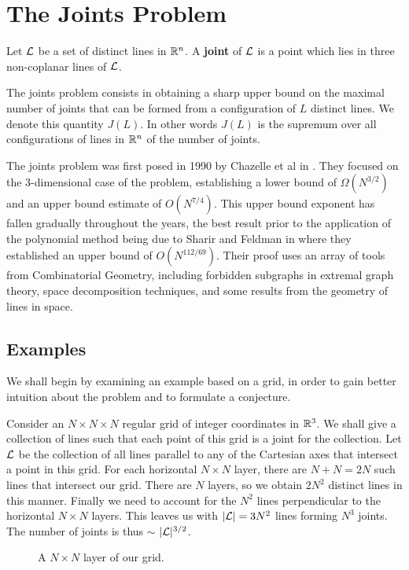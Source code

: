 \chapter{The Joints Problem \label{chap:joints}}
\begin{definition}
    Let $\mathcal L$ be a set of distinct lines in $\mathbb R^n$. A \textbf{joint} of $\mathcal L$ is a point which lies in three non-coplanar lines of $\mathcal L$.
\end{definition}
The joints problem consists in obtaining a sharp upper bound on the maximal number of joints that can be formed from a configuration of $L$ distinct lines.
We denote this quantity $J(L)$. In other words $J(L)$ is the supremum over all configurations of lines in $\mathbb R^n$ of the number of joints.

The joints problem was first posed in 1990 by Chazelle et al in \cite{chazelle1990counting}. They focused on the 3-dimensional case of the problem, establishing a lower bound of $\Omega (N^{3/2})$ and an upper bound estimate of $O(N^{7/4})$. 
This upper bound exponent has fallen gradually throughout the years, the best result prior to the application of the polynomial method being due to Sharir and Feldman in \cite{feldman2005improved} where they established an upper bound of $O(N^{112/69})$. Their
proof uses an array of tools from Combinatorial Geometry, including forbidden subgraphs in extremal graph theory, space decomposition techniques, and some results from the geometry of lines in space.

\section{Examples}
We shall begin by examining an example based on a grid, in order to gain better intuition about the problem and to formulate a conjecture. 
\begin{example}Consider an $N \times N \times N$ regular grid of integer coordinates in $\mathbb R^3$. We shall give a collection of lines such that each point of this grid is a joint for the collection.
Let $\mathcal L$ be the collection of all lines parallel to any of the Cartesian axes that intersect a point in this grid.
For each horizontal $N \times N$ layer, there are $N+N = 2N$ such lines that intersect our grid. 
There are $N$ layers, so we obtain $2N^2$ distinct lines in this manner. Finally we need to account for the $N^2$ lines perpendicular to the horizontal $N\times N$ layers.
This leaves us with $|\mathcal L| = 3 N^2$ lines forming $N^3$ joints. The number of joints is thus $\sim$ $|\mathcal L|^{3/2}$. 
\end{example}
\begin{figure}[h]
    \centering
{}
\caption{A $N \times N$ layer of our grid.}
\end{figure}

